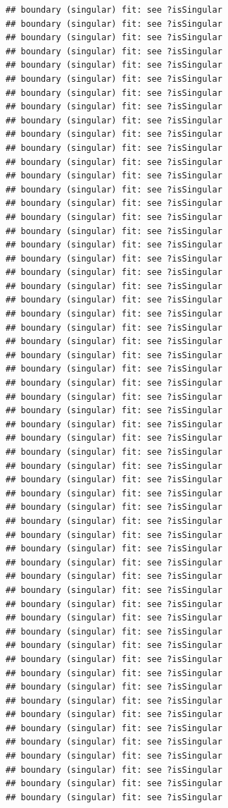 \documentclass[
]{article}
\begin{document}
\begin{verbatim}
## boundary (singular) fit: see ?isSingular
## boundary (singular) fit: see ?isSingular
## boundary (singular) fit: see ?isSingular
## boundary (singular) fit: see ?isSingular
## boundary (singular) fit: see ?isSingular
## boundary (singular) fit: see ?isSingular
## boundary (singular) fit: see ?isSingular
## boundary (singular) fit: see ?isSingular
## boundary (singular) fit: see ?isSingular
## boundary (singular) fit: see ?isSingular
## boundary (singular) fit: see ?isSingular
## boundary (singular) fit: see ?isSingular
## boundary (singular) fit: see ?isSingular
## boundary (singular) fit: see ?isSingular
## boundary (singular) fit: see ?isSingular
## boundary (singular) fit: see ?isSingular
## boundary (singular) fit: see ?isSingular
## boundary (singular) fit: see ?isSingular
## boundary (singular) fit: see ?isSingular
## boundary (singular) fit: see ?isSingular
## boundary (singular) fit: see ?isSingular
## boundary (singular) fit: see ?isSingular
## boundary (singular) fit: see ?isSingular
## boundary (singular) fit: see ?isSingular
## boundary (singular) fit: see ?isSingular
## boundary (singular) fit: see ?isSingular
## boundary (singular) fit: see ?isSingular
## boundary (singular) fit: see ?isSingular
## boundary (singular) fit: see ?isSingular
## boundary (singular) fit: see ?isSingular
## boundary (singular) fit: see ?isSingular
## boundary (singular) fit: see ?isSingular
## boundary (singular) fit: see ?isSingular
## boundary (singular) fit: see ?isSingular
## boundary (singular) fit: see ?isSingular
## boundary (singular) fit: see ?isSingular
## boundary (singular) fit: see ?isSingular
## boundary (singular) fit: see ?isSingular
## boundary (singular) fit: see ?isSingular
## boundary (singular) fit: see ?isSingular
## boundary (singular) fit: see ?isSingular
## boundary (singular) fit: see ?isSingular
## boundary (singular) fit: see ?isSingular
## boundary (singular) fit: see ?isSingular
## boundary (singular) fit: see ?isSingular
## boundary (singular) fit: see ?isSingular
## boundary (singular) fit: see ?isSingular
## boundary (singular) fit: see ?isSingular
## boundary (singular) fit: see ?isSingular
## boundary (singular) fit: see ?isSingular
## boundary (singular) fit: see ?isSingular
## boundary (singular) fit: see ?isSingular
## boundary (singular) fit: see ?isSingular
## boundary (singular) fit: see ?isSingular
## boundary (singular) fit: see ?isSingular
## boundary (singular) fit: see ?isSingular
## boundary (singular) fit: see ?isSingular
## boundary (singular) fit: see ?isSingular

\end{verbatim}
\end{document}
